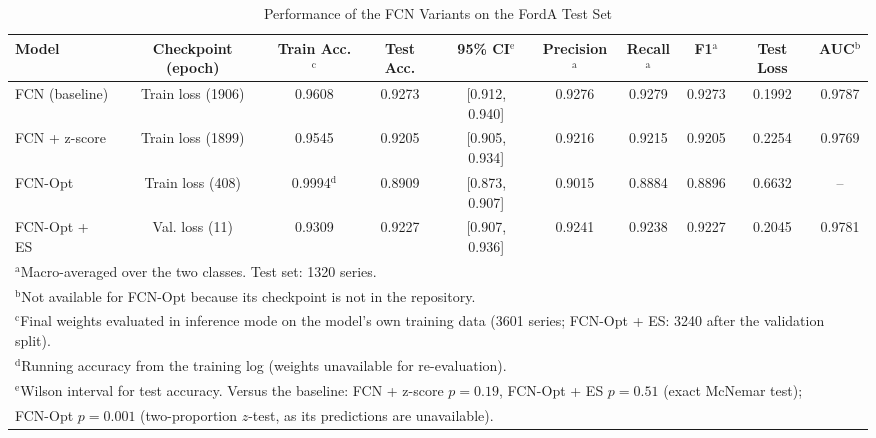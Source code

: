 \begin{table}[htbp]
\caption{Performance of the FCN Variants on the FordA Test Set}
\begin{center}
\begin{tabular}{|l|c|c|c|c|c|c|c|c|c|}
\hline
\textbf{Model} & \textbf{Checkpoint (epoch)} & \textbf{Train Acc.}$^{\mathrm{c}}$ & \textbf{Test Acc.} & \textbf{95\% CI}$^{\mathrm{e}}$ & \textbf{Precision}$^{\mathrm{a}}$ & \textbf{Recall}$^{\mathrm{a}}$ & \textbf{F1}$^{\mathrm{a}}$ & \textbf{Test Loss} & \textbf{AUC}$^{\mathrm{b}}$ \\
\hline
FCN (baseline) & Train loss (1906) & 0.9608 & 0.9273 & [0.912, 0.940] & 0.9276 & 0.9279 & 0.9273 & 0.1992 & 0.9787 \\
\hline
FCN + z-score & Train loss (1899) & 0.9545 & 0.9205 & [0.905, 0.934] & 0.9216 & 0.9215 & 0.9205 & 0.2254 & 0.9769 \\
\hline
FCN-Opt & Train loss (408) & 0.9994$^{\mathrm{d}}$ & 0.8909 & [0.873, 0.907] & 0.9015 & 0.8884 & 0.8896 & 0.6632 & -- \\
\hline
FCN-Opt + ES & Val. loss (11) & 0.9309 & 0.9227 & [0.907, 0.936] & 0.9241 & 0.9238 & 0.9227 & 0.2045 & 0.9781 \\
\hline
\multicolumn{10}{l}{$^{\mathrm{a}}$Macro-averaged over the two classes. Test set: 1320 series.} \\
\multicolumn{10}{l}{$^{\mathrm{b}}$Not available for FCN-Opt because its checkpoint is not in the repository.} \\
\multicolumn{10}{l}{$^{\mathrm{c}}$Final weights evaluated in inference mode on the model's own training data (3601 series; FCN-Opt + ES: 3240 after the validation split).} \\
\multicolumn{10}{l}{$^{\mathrm{d}}$Running accuracy from the training log (weights unavailable for re-evaluation).} \\
\multicolumn{10}{l}{$^{\mathrm{e}}$Wilson interval for test accuracy. Versus the baseline: FCN + z-score $p=0.19$, FCN-Opt + ES $p=0.51$ (exact McNemar test);} \\
\multicolumn{10}{l}{\phantom{$^{\mathrm{e}}$}FCN-Opt $p=0.001$ (two-proportion $z$-test, as its predictions are unavailable).}
\end{tabular}
\label{tab:results}
\end{center}
\end{table}
